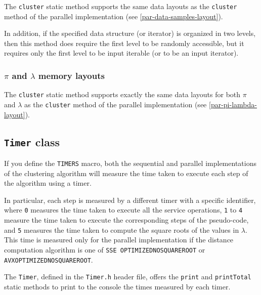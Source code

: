 \documentclass{article}
\begin{document}
The \texttt{cluster} static method supports the same data layouts as the \texttt{cluster} method
of the parallel implementation (see \ref{par-data-samples-layout}).

In addition, if the specified data structure (or iterator) is organized in two levels, then this
method does require the first level to be randomly accessible, but it requires only the first
level to be input iterable (or to be an input iterator).

\hypertarget{seq-pi-lambda-layout}{
\subsubsection{\texorpdfstring{\boldmath$\pi$ and \boldmath$\lambda$}{pi and lambda} memory layouts}
\label{seq-pi-lambda-layout}}

The \texttt{cluster} static method supports exactly the same data layouts for both $\pi$
and $\lambda$ as the \texttt{cluster} method
of the parallel implementation (see \ref{par-pi-lambda-layout}).

\hypertarget{timers}{
\subsection{\texttt{Timer} class}
\label{timer}}

If you define the \texttt{TIMERS} macro, both the sequential and parallel implementations of the
clustering algorithm will measure the time taken to execute each step of the algorithm using a
timer.

In particular, each step is measured by a different timer with a specific identifier, where
\texttt{0} measures the time taken to execute all the service operations, \texttt{1} to
\texttt{4} measure the time taken to execute the corresponding steps of the pseudo-code,
and \texttt{5} measures the time taken to compute the square roots of the values in
$\lambda$. This time is measured only for the parallel implementation if the distance
computation algorithm is one of \texttt{SSE\textunderscore
OPTIMIZED\textunderscore NO\textunderscore SQUARE\textunderscore ROOT} or\\
\texttt{AVX\textunderscore OPTIMIZED\textunderscore NO\textunderscore SQUARE\textunderscore ROOT}.

The \texttt{Timer}, defined in the \texttt{Timer.h} header file, offers the \texttt{print} and
\texttt{printTotal} static methods to print to the console the times measured by each timer.
\end{document}
